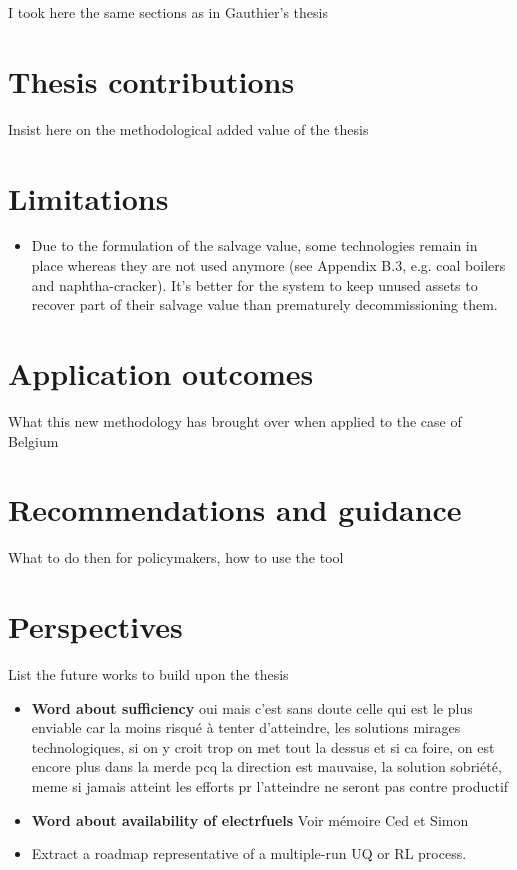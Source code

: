 I took here the same sections as in Gauthier's thesis
\section*{Thesis contributions}
Insist here on the methodological added value of the thesis

\section*{Limitations}
\begin{itemize}
\item Due to the formulation of the salvage value, some technologies remain in place whereas they are not used anymore (see Appendix B.3, e.g. coal boilers and naphtha-cracker). It's better for the system to keep unused assets to recover part of their salvage value than prematurely decommissioning them.
\end{itemize}

\section*{Application outcomes}
What this new methodology has brought over when applied to the case of Belgium

\section*{Recommendations and guidance}
What to do then for policymakers, how to use the tool

\section*{Perspectives}
List the future works to build upon the thesis

\begin{itemize}
\item \textbf{Word about sufficiency} oui mais c'est sans doute celle qui est le plus enviable car la moins risqué à tenter d'atteindre, les solutions mirages technologiques, si on y croit trop on met tout la dessus et si ca foire, on est encore plus dans la merde pcq la direction est mauvaise, la solution sobriété, meme si jamais atteint les efforts pr l'atteindre ne seront pas contre productif
\item \textbf{Word about availability of electrfuels} Voir mémoire Ced et Simon
\item Extract a roadmap representative of a multiple-run UQ or RL process.
\end{itemize}


